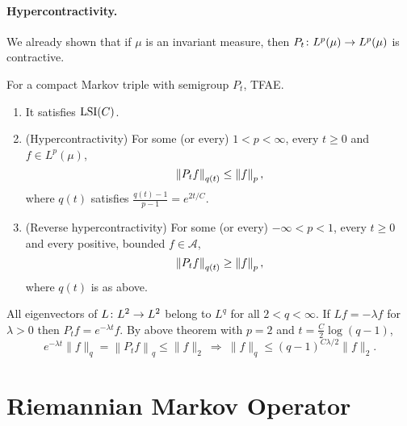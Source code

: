 \paragraph{Hypercontractivity.} We already shown that if $\mu$ is an invariant measure, then $P_t \colon L^p(\mu) \rightarrow L^p(\mu)$ is contractive.

\begin{thm}
    For a compact Markov triple with semigroup $P_t$, TFAE.
    \begin{enumerate}[label=(\arabic{*})]
        \item It satisfies $\operatorname{LSI}(C)$.
        \item (Hypercontractivity) For some (or every) $1 < p < \infty$, every $t \geq 0$ and $f \in L^p(\mu)$,
        \begin{equation*}
            \left\lVert P_t f\right\lVert_{q(t)} \leq \left\lVert f\right\lVert_p,
        \end{equation*}
        where  $q(t)$ satisfies $\frac{q(t)-1}{p-1} = e^{2t / C}$.
        \item (Reverse hypercontractivity) For some (or every) $- \infty < p < 1$, every $t \geq 0$ and every positive, bounded $f \in \mathcal{A}$,
        \begin{equation*}
            \left\lVert P_t f\right\lVert_{q(t)} \geq \left\lVert f\right\lVert_p,
        \end{equation*}
        where $q(t)$ is as above.
    \end{enumerate}
\end{thm}
\begin{rmk}
    All eigenvectors of $L \colon L^2 \rightarrow L^2$ belong to $L^q$ for all $2 < q <\infty$. If $Lf = -\lambda f$ for $\lambda > 0$ then $P_tf = e^{-\lambda t} f$. By above theorem with $p = 2$ and $t = \frac{C}{2}\log (q - 1)$,
    \begin{equation*}
        e^{-\lambda t}\|f\|_q=\left\|P_t f\right\|_q \leq\|f\|_2 ~\Rightarrow~ \|f\|_q \leq(q-1)^{C \lambda / 2}\|f\|_2.
    \end{equation*}
\end{rmk}

\section{Riemannian Markov Operator}

